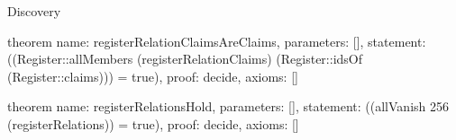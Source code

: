 \begin{lexlean}{Discovery}
\begin{semanticmodule}
theorem{
  name: registerRelationClaimsAreClaims,
  parameters: [],
  statement: ((Register::allMembers (registerRelationClaims) (Register::idsOf (Register::claims))) = true),
  proof: decide{},
  axioms: []
}

theorem{
  name: registerRelationsHold,
  parameters: [],
  statement: ((allVanish 256 (registerRelations)) = true),
  proof: decide{},
  axioms: []
}
\end{semanticmodule}
\end{lexlean}

